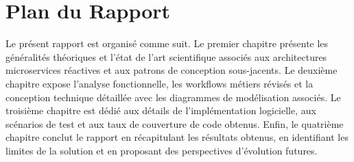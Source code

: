 \section{Plan du Rapport}
Le présent rapport est organisé comme suit. Le premier chapitre présente les généralités théoriques et l'état de l'art scientifique associés aux architectures microservices réactives et aux patrons de conception sous-jacents. Le deuxième chapitre expose l'analyse fonctionnelle, les workflows métiers révisés et la conception technique détaillée avec les diagrammes de modélisation associés. Le troisième chapitre est dédié aux détails de l'implémentation logicielle, aux scénarios de test et aux taux de couverture de code obtenus. Enfin, le quatrième chapitre conclut le rapport en récapitulant les résultats obtenus, en identifiant les limites de la solution et en proposant des perspectives d'évolution futures.
